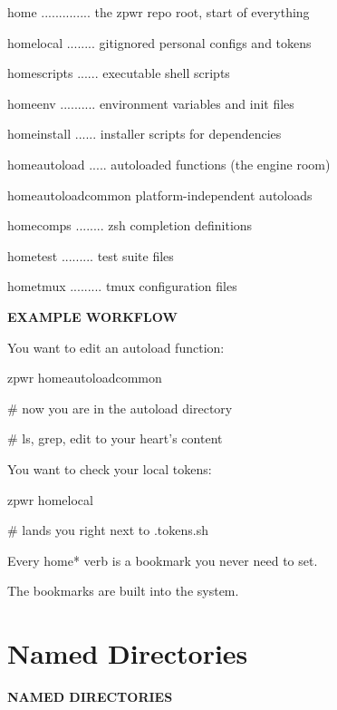 \documentclass[11pt,a4paper,twoside]{book}
\begin{document}
home .............. the zpwr repo root, start of everything

homelocal ........ gitignored personal configs and tokens

homescripts ...... executable shell scripts

homeenv .......... environment variables and init files

homeinstall ...... installer scripts for dependencies

homeautoload ..... autoloaded functions (the engine room)

homeautoloadcommon  platform-independent autoloads

homecomps ........ zsh completion definitions

hometest ......... test suite files

hometmux ......... tmux configuration files


\vspace{12pt}
{\bfseries\color{neonyellow} EXAMPLE WORKFLOW}\vspace{4pt}

You want to edit an autoload function:

\begin{codebox}
zpwr homeautoloadcommon\\
\end{codebox}

\# now you are in the autoload directory

\# ls, grep, edit to your heart's content

You want to check your local tokens:

\begin{codebox}
zpwr homelocal\\
\end{codebox}

\# lands you right next to .tokens.sh

Every home* verb is a bookmark you never need to set.

The bookmarks are built into the system.


\vspace{16pt}

\section{Named Directories}


\vspace{10pt}
{\large\bfseries\color{neoncyan} NAMED DIRECTORIES}\vspace{6pt}
\end{document}
